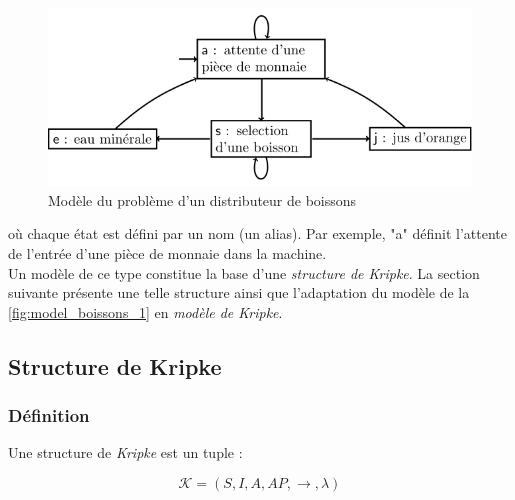 \documentclass[runningheads,a4paper,10pt]{llncs}
\begin{document}
\begin{figure}
  \centering
   \includegraphics[scale=0.4]{figures/model-boissons.png}
   \caption[Caption for LOF]{Modèle du problème d'un distributeur de boissons \cite{wiki}}
   \label{fig:model_boissons_1}
\end{figure}

\noindent
où chaque état est défini par un nom (un alias). Par exemple, "a" définit l'attente de l'entrée d'une pièce de monnaie dans la machine. \\

Un modèle de ce type constitue la base d'une \textit{structure de Kripke}. La section suivante présente une telle structure ainsi que l'adaptation du modèle de la \autoref{fig:model_boissons_1} en \textit{modèle de Kripke}. 

\subsection{Structure de Kripke} \label{sec:kripke}

\subsubsection{Définition} 

Une structure de \textit{Kripke} \cite{Kripke} est un tuple : 

$$\boxed{\mathcal{K} = (S,I,A,AP,\longrightarrow,\lambda)}$$ 
\end{document}
